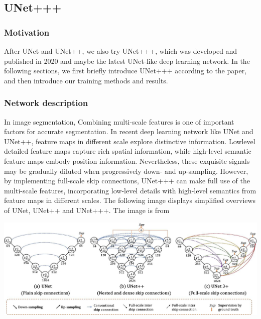 \subsection{UNet+++}
\subsubsection{Motivation}
After UNet and UNet++, we also try UNet+++\cite{unet_ppp},
which was developed and published in 2020 and maybe the latest UNet-like deep learning network.
In the following sections, we first briefly introduce UNet+++ according to the paper, and then introduce our training methods and results.

\subsubsection{Network description}
In image segmentation, Combining multi-scale features is one of important factors for accurate segmentation.
In recent deep learning network like UNet and UNet++, feature maps in different scale explore distinctive information. Lowlevel detailed feature maps capture rich spatial information, 
while high-level semantic feature maps embody position information. 
Nevertheless, these exquisite signals may be gradually diluted when progressively down- and up-sampling.
However, by implementing full-scale skip connections, UNet+++ can make full use of the multi-scale features, incorporating low-level details with high-level semantics from feature maps in different scales. 
The following image displays simplified overviews of UNet, UNet++ and UNet+++. The image is from \cite{unet_ppp}

\includegraphics[width=\linewidth]{figuras/UNet+++.jpg}